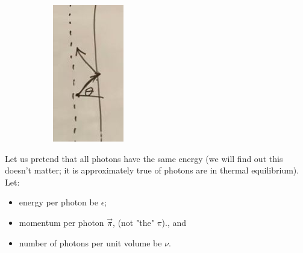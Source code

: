 \documentclass[]{article}
\begin{document}
\begin{figure}[H]
\begin{subfigure}[t]{0.4\textwidth}
		\includegraphics[width=\textwidth]{cosmo-5-wall}
	\end{subfigure}
\end{figure}


Let us pretend that all photons have the same energy (we will find out this doesn't matter; it is approximately true of photons are in thermal equilibrium). Let:
\begin{itemize}
	\item energy per photon be $\epsilon$;
	\item  momentum per photon $\vec{\pi}$, (not "the" $\pi$)., and 
	\item number of photons per unit volume be $\nu$.
\end{itemize}
\end{document}
